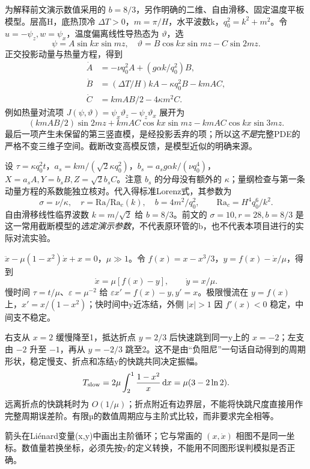 为解释前文演示数值采用的 $b=8/3$，另作明确的二维、自由滑移、固定温度平板模型。层高H，底热顶冷 $\Delta T>0$，$m=\pi/H$，水平波数k，$q_0^2=k^2+m^2$。令 $u=-\psi_z,w=\psi_x$，温度偏离线性导热态为 $\vartheta$，选
\[
 \psi=A\sin kx\sin mz,\quad
 \vartheta=B\cos kx\sin mz-C\sin2mz.
\]
正交投影动量与热量方程，得到
\begin{align*}
 \dot A&=-\nu q_0^2A+(g\alpha k/q_0^2)B,\\
 \dot B&=(\Delta T/H)kA-\kappa q_0^2B-kmAC,\\
 \dot C&=kmAB/2-4\kappa m^2C.
\end{align*}
例如热量对流项 $J(\psi,\vartheta)=\psi_x\vartheta_z-\psi_z\vartheta_x$ 展开为
\[
 (kmAB/2)\sin2mz+kmAC\cos kx\sin mz-kmAC\cos kx\sin3mz.
\]
最后一项产生未保留的第三竖直模，是经投影丢弃的项；所以这\emph{不是}完整PDE的严格不变三维子空间。截断改变高模反馈，是模型近似的明确来源。

设 $\tau=\kappa q_0^2t$，$a_s=km/(\sqrt2\kappa q_0^2)$，$b_s=a_sg\alpha k/(\nu q_0^4)$，$X=a_sA,Y=b_sB,Z=\sqrt2b_sC$。注意 $b_s$ 的分母没有额外的 $\kappa$；量纲检查与第一条动量方程的系数能独立核对。代入得标准Lorenz式，其参数为
\[
 \sigma=\nu/\kappa,\quad r=\mathrm{Ra}/\mathrm{Ra}_c(k),\quad
 b=4m^2/q_0^2,\qquad
 \mathrm{Ra}_c=H^4q_0^6/k^2.
\]
自由滑移线性临界波数 $k=m/\sqrt2$ 给 $b=8/3$。前文的 $\sigma=10,r=28,b=8/3$ 是这一常用截断模型的\emph{选定演示参数}，不代表原环管的b，也不代表本项目进行的实际对流实验。

$\ddot x-\mu(1-x^2)\dot x+x=0$，$\mu\gg1$。令 $f(x)=x-x^3/3$，$y=f(x)-\dot x/\mu$，得到
\[
 \dot x=\mu[f(x)-y],\qquad \dot y=x/\mu.
\]
慢时间 $\tau=t/\mu$、$\varepsilon=\mu^{-2}$ 给 $\varepsilon x'=f(x)-y,y'=x$。极限慢流在 $y=f(x)$ 上，$x'=x/(1-x^2)$；快时间中y近冻结，外侧 $|x|>1$ 因 $f'(x)<0$ 稳定，中间支不稳定。

右支从 $x=2$ 缓慢降至1，抵达折点 $y=2/3$ 后快速跳到同一y上的 $x=-2$；左支由 $-2$ 升至 $-1$，再从 $y=-2/3$ 跳至2。这不是由“负阻尼”一句话自动得到的周期形状，稳定慢支、折点和冻结y的快跳共同决定振幅。
\[
 T_{\rm slow}=2\mu\int_2^1\frac{1-x^2}{x}\,\mathrm d x
             =\mu(3-2\ln2).
\]
远离折点的快跳耗时为 $O(1/\mu)$；折点附近有边界层，不能将快跳尺度直接用作完整周期误差阶。有限µ的数值周期应与主阶式比较，而非要求完全相等。
\begin{center}\end{center}
箭头在Liénard变量(x,y)中画出主阶循环；它与常画的 $(x,\dot x)$ 相图不是同一坐标。数值量若换坐标，必须先按y的定义转换，不能用不同图形误判模拟是否正确。
